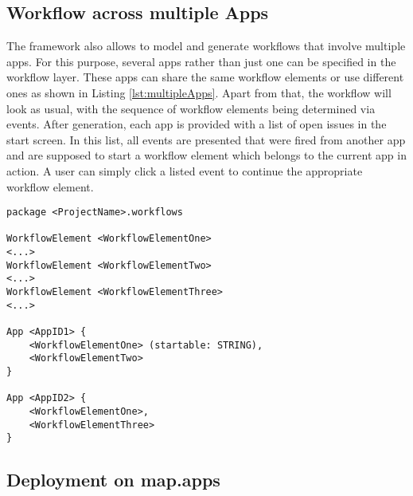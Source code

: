 
\subsection{Workflow across multiple Apps}
\label{subsec:WorkflowMultipleApps}
The \MD framework also allows to model and generate workflows that involve multiple apps. For this purpose, several apps rather than just one can be specified in the workflow layer. These apps can share the same workflow elements or use different ones as shown in Listing \ref{lst:multipleApps}. Apart from that, the workflow will look as usual, with the sequence of workflow elements being determined via events. After generation, each app is provided with a list of open issues in the start screen. In this list, all events are presented that were fired from another app and are supposed to start a workflow element which belongs to the current app in action. A user can simply click a listed event to continue the appropriate workflow element.

\begin{lstlisting}[language=MD2, label=lst:multipleApps, caption=Workflow Definition for Multiple Apps]
package <ProjectName>.workflows

WorkflowElement <WorkflowElementOne>
<...>
WorkflowElement <WorkflowElementTwo>
<...>
WorkflowElement <WorkflowElementThree>
<...>

App <AppID1> {
	<WorkflowElementOne> (startable: STRING),
	<WorkflowElementTwo>
}

App <AppID2> {
	<WorkflowElementOne>,
	<WorkflowElementThree>
}
\end{lstlisting}


\subsection{Deployment on map.apps}
\label{subsec:DeploymentMultipleApps}
